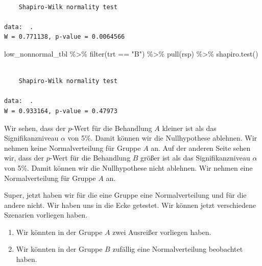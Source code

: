 \documentclass[
  letterpaper,
]{scrbook}
\newenvironment{Shaded}{\begin{snugshade}}{\end{snugshade}}
\newcommand{\FunctionTok}[1]{\textcolor[rgb]{0.28,0.35,0.67}{#1}}
\newcommand{\NormalTok}[1]{\textcolor[rgb]{0.00,0.23,0.31}{#1}}
\newcommand{\SpecialCharTok}[1]{\textcolor[rgb]{0.37,0.37,0.37}{#1}}
\newcommand{\StringTok}[1]{\textcolor[rgb]{0.13,0.47,0.30}{#1}}
\providecommand{\tightlist}{%
  \setlength{\itemsep}{0pt}\setlength{\parskip}{0pt}}\usepackage{longtable,booktabs,array}
\begin{document}
\begin{verbatim}

    Shapiro-Wilk normality test

data:  .
W = 0.771138, p-value = 0.0064566
\end{verbatim}

\begin{Shaded}
\begin{Highlighting}[]
\NormalTok{low\_nonnormal\_tbl }\SpecialCharTok{\%\textgreater{}\%} 
  \FunctionTok{filter}\NormalTok{(trt }\SpecialCharTok{==} \StringTok{"B"}\NormalTok{) }\SpecialCharTok{\%\textgreater{}\%} 
  \FunctionTok{pull}\NormalTok{(rsp) }\SpecialCharTok{\%\textgreater{}\%} 
  \FunctionTok{shapiro.test}\NormalTok{()}
\end{Highlighting}
\end{Shaded}

\begin{verbatim}

    Shapiro-Wilk normality test

data:  .
W = 0.933164, p-value = 0.47973
\end{verbatim}

Wir sehen, dass der \(p\)-Wert für die Behandlung \(A\) kleiner ist als
das Signifikanzniveau \(\alpha\) von 5\%. Damit können wir die
Nullhypothese ablehnen. Wir nehmen keine Normalverteilung für Gruppe
\(A\) an. Auf der anderen Seite sehen wir, dass der \(p\)-Wert für die
Behandlung \(B\) größer ist als das Signifikanzniveau \(\alpha\) von
5\%. Damit können wir die Nullhypothese nicht ablehnen. Wir nehmen eine
Normalverteilung für Gruppe \(A\) an.

Super, jetzt haben wir für die eine Gruppe eine Normalverteilung und für
die andere nicht. Wir haben uns in die Ecke getestet. Wir können jetzt
verschiedene Szenarien vorliegen haben.

\begin{enumerate}
\def\labelenumi{\arabic{enumi})}
\tightlist
\item
  Wir könnten in der Gruppe \(A\) zwei Ausreißer vorliegen haben.
\item
  Wir könnten in der Gruppe \(B\) zufällig eine Normalverteilung
  beobachtet haben.
\end{enumerate}

{}
\end{document}
